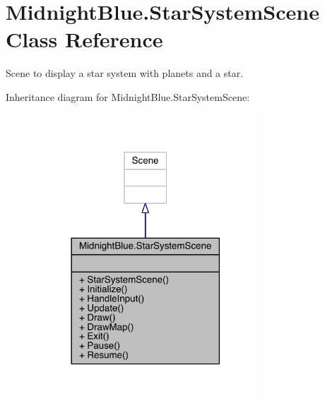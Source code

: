 \hypertarget{class_midnight_blue_1_1_star_system_scene}{}\section{Midnight\+Blue.\+Star\+System\+Scene Class Reference}
\label{class_midnight_blue_1_1_star_system_scene}


Scene to display a star system with planets and a star.  




Inheritance diagram for Midnight\+Blue.\+Star\+System\+Scene\+:
\nopagebreak
\begin{figure}[H]
\begin{center}
\leavevmode
\includegraphics[width=237pt]{class_midnight_blue_1_1_star_system_scene__inherit__graph}
\end{center}
\end{figure}


